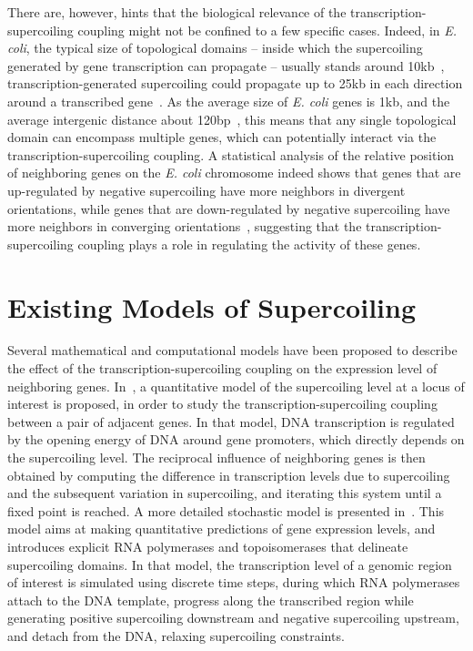 There are, however, hints that the biological relevance of the transcription-supercoiling coupling might not be confined to a few specific cases.
Indeed, in \emph{E. coli}, the typical size of topological domains --  inside which the supercoiling generated by gene transcription can propagate -- usually stands around 10kb~\citep{postow2004}, transcription-generated supercoiling could propagate up to 25kb in each direction around a transcribed gene~\citep{visser2022}.
As the average size of \emph{E. coli} genes is 1kb, and the average intergenic distance about 120bp~\citep{blattner1997}, this means that any single topological domain can encompass multiple genes, which can potentially interact via the transcription-supercoiling coupling.
A statistical analysis of the relative position of neighboring genes on the \emph{E. coli} chromosome indeed shows that genes that are up-regulated by negative supercoiling have more neighbors in divergent orientations, while genes that are down-regulated by negative supercoiling have more neighbors in converging orientations~\citep{sobetzko2016}, suggesting that the transcription-supercoiling coupling plays a role in regulating the activity of these genes.


\section{Existing Models of Supercoiling}

Several mathematical and computational models have been proposed to describe the effect of the transcription-supercoiling coupling on the expression level of neighboring genes.
In~\cite{meyer2014}, a quantitative model of the supercoiling level at a locus of interest is proposed, in order to study the transcription-supercoiling coupling between a pair of adjacent genes.
In that model, DNA transcription is regulated by the opening energy of DNA around gene promoters, which directly depends on the supercoiling level.
The reciprocal influence of neighboring genes is then obtained by computing the difference in transcription levels due to supercoiling and the subsequent variation in supercoiling, and iterating this system until a fixed point is reached.
A more detailed stochastic model is presented in~\cite{elhoudaigui2019}.
This model aims at making quantitative predictions of gene expression levels, and introduces explicit RNA polymerases and topoisomerases that delineate supercoiling domains.
In that model, the transcription level of a genomic region of interest is simulated using discrete time steps, during which RNA polymerases attach to the DNA template, progress along the transcribed region while generating positive supercoiling downstream and negative supercoiling upstream, and detach from the DNA, relaxing supercoiling constraints.

